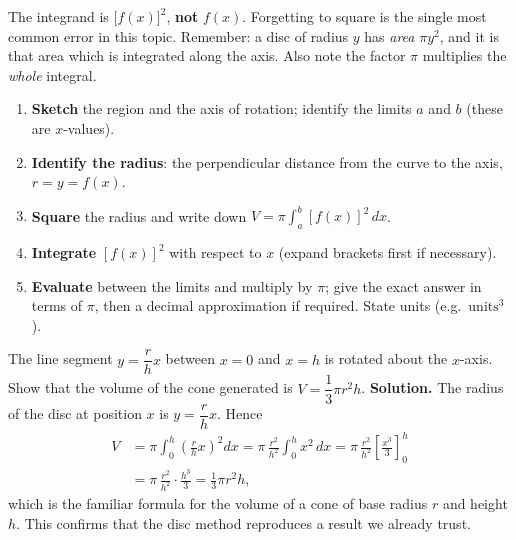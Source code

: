 \documentclass[11pt]{article}
\begin{document}
\begin{attention}
The integrand is $\bigl[f(x)\bigr]^{2}$, \textbf{not} $f(x)$. Forgetting to square is the single most common error in this topic. Remember: a disc of radius $y$ has \emph{area} $\pi y^{2}$, and it is that area which is integrated along the axis. Also note the factor $\pi$ multiplies the \emph{whole} integral.
\end{attention}

\begin{methode}
\begin{enumerate}
\item \textbf{Sketch} the region and the axis of rotation; identify the limits $a$ and $b$ (these are $x$-values).
\item \textbf{Identify the radius}: the perpendicular distance from the curve to the axis, $r=y=f(x)$.
\item \textbf{Square} the radius and write down $V=\pi\displaystyle\int_{a}^{b}[f(x)]^{2}\,dx$.
\item \textbf{Integrate} $[f(x)]^{2}$ with respect to $x$ (expand brackets first if necessary).
\item \textbf{Evaluate} between the limits and multiply by $\pi$; give the exact answer in terms of $\pi$, then a decimal approximation if required. State units (e.g.\ $\mathrm{units}^{3}$).
\end{enumerate}
\end{methode}

\begin{exoresolu}
The line segment $y=\dfrac{r}{h}x$ between $x=0$ and $x=h$ is rotated about the $x$-axis. Show that the volume of the cone generated is $V=\dfrac{1}{3}\pi r^{2}h$.
\tcblower
\textbf{Solution.} The radius of the disc at position $x$ is $y=\dfrac{r}{h}x$. Hence
\begin{align*}
V&=\pi\int_{0}^{h}\left(\frac{r}{h}x\right)^{2}dx
=\pi\,\frac{r^{2}}{h^{2}}\int_{0}^{h}x^{2}\,dx
=\pi\,\frac{r^{2}}{h^{2}}\left[\frac{x^{3}}{3}\right]_{0}^{h}\\
&=\pi\,\frac{r^{2}}{h^{2}}\cdot\frac{h^{3}}{3}
=\frac{1}{3}\pi r^{2}h,
\end{align*}
which is the familiar formula for the volume of a cone of base radius $r$ and height $h$. This confirms that the disc method reproduces a result we already trust.
\end{exoresolu}
\end{document}

